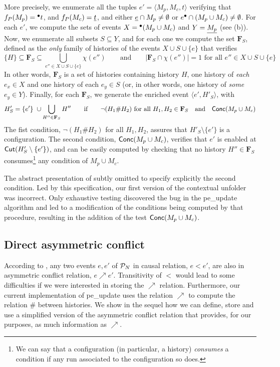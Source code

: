 \documentclass[11pt,a4paper]{article}
\newcommand{\confl}{\ensuremath{\mathord{\#}}}
\newcommand{\peupdate}{\mbox{\sf pe\_update}}
\begin{document}
More precisely, we enumerate all the tuples $e' = \langle M_p, M_c, t \rangle$
verifying that $f_P (M_p) = {}^\bullet t$, and $f_P (M_c) = \underline{t}$, and either
$\underline{e} \cap M_p \ne \emptyset$ or $e^\bullet \cap (M_p \cup M_c) \ne
\emptyset$.  For each $e'$, we compute the sets of events $X = {}^\bullet(M_p \cup
M_c)$ and $Y = \underline{M_p}$ (see  (b)).  Now, we
enumerate all subsets $S \subseteq Y$, and for each one we compute the set
$\mathbf{F}_S$, defined as the \emph{only} family of histories of the events $X
\cup S \cup \{e\}$ that verifies $$ \{H\} \subseteq \mathbf{F}_S \subseteq
\bigcup_{e'' \in X \cup S \cup \{e\}} \chi (e'') \qquad \mbox{and} \qquad
|\mathbf{F}_S \cap \chi(e'')| = 1 \mbox{ for all } e'' \in X \cup S \cup
\{e\}$$  In other words, $\mathbf{F}_S$ is a set of histories containing
history $H$, one history of \emph{each} $e_x \in X$ and one history of each
$e_y \in S$ (or, in other words, one history of \emph{some} $e_y \in Y$).
Finally, for each $\mathbf{F}_S$, we generate the enriched event $\langle e',
H'_S \rangle$, with $$H'_S = \{e'\} \ \cup \bigcup_{H'' \in \mathbf{F}_S} H''
\qquad \mbox{if} \qquad \lnot (H_1 \confl H_2) \mbox{ for all } H_1, H_2 \in
\mathbf{F}_S \quad \mbox{and} \quad \conc{M_p \cup M_c}$$  The fist condition,
$\lnot (H_1 \confl H_2)$ for all $H_1, H_2$, assures that $H'_S \setminus
\{e'\}$ is a configuration.  The second condition, $\mathsf{Conc }{(M_p \cup M_c)}$,
verifies that $e'$ is enabled at $\mathsf{Cut }{(H'_S \setminus \{e'\})}$, and can be
easily computed by checking that no history $H'' \in \mathbf{F}_S$
consumes\footnote{We can say that a configuration (in particular, a history)
\emph{consumes} a condition if any run associated to the configuration so
does.} any condition of $M_p \cup M_c$.

The abstract presentation of  subtly omitted to specify explicitly
the second condition.  Led by this specification, our first version of the
contextual unfolder was incorrect.  Only exhaustive testing discovered the bug
in the \peupdate{} algorithm and led to a modification of the conditions being
computed by that procedure, resulting in the addition of the test $\mathsf{Conc }{(M_p
\cup M_c)}$.  

\subsection{Direct asymmetric conflict}
\label{sec:direct.asymmetric}

According to , any two events $e, e'$ of $\mathcal{P}_{N}$ in
causal relation, $e < e'$, are also in asymmetric conflict relation, $e
\nearrow e'$.  Transitivity of $<$ would lead to some difficulties if we were
interested in storing the $\nearrow$ relation.  Furthermore, our current
implementation of \peupdate{} uses the relation $\nearrow$ to compute the
relation $\confl$ between histories.  We show in the sequel how we can define,
store and use a simplified version of the asymmetric conflict relation that
provides, for our purposes, as much information as $\nearrow$.
\end{document}
